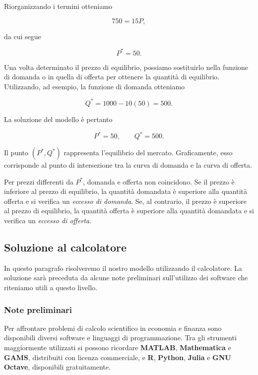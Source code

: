 Riorganizzando i termini otteniamo

\begin{equation*}
    750 = 15P,
\end{equation*}

da cui segue

\begin{equation*}
    P^* = 50.
\end{equation*}

Una volta determinato il prezzo di equilibrio, possiamo sostituirlo
nella funzione di domanda o in quella di offerta per ottenere la quantità di equilibrio. Utilizzando, ad esempio, la funzione di
domanda otteniamo

\begin{equation*}
    Q^* = 1000 - 10(50) = 500.
\end{equation*}

La soluzione del modello è pertanto

\begin{equation*}
    P^* = 50,
    \qquad
    Q^* = 500.
\end{equation*}

Il punto $(P^*,Q^*)$ rappresenta l'equilibrio del mercato.
Graficamente, esso corrisponde al punto di intersezione tra la curva
di domanda e la curva di offerta.

Per prezzi differenti da $P^*$, domanda e offerta non coincidono.
Se il prezzo è inferiore al prezzo di equilibrio, la quantità
domandata è superiore alla quantità offerta e si verifica un
\emph{eccesso di domanda}. Se, al contrario, il prezzo è superiore
al prezzo di equilibrio, la quantità offerta è superiore alla
quantità domandata e si verifica un \emph{eccesso di offerta}.

\subsection{Soluzione al calcolatore}

In questo paragrafo risolveremo il nostro modello utilizzando il calcolatore. La soluzione sarà preceduta da alcune note preliminari sull'utilizzo dei software che riteniamo utili a questo livello.

\subsubsection{Note preliminari}

Per affrontare problemi di calcolo scientifico in economia e finanza sono
disponibili diversi software e linguaggi di programmazione. Tra gli strumenti
maggiormente utilizzati si possono ricordare \textbf{MATLAB},
\textbf{Mathematica} e \textbf{GAMS}, distribuiti con licenza commerciale,
e \textbf{R}, \textbf{Python}, \textbf{Julia} e \textbf{GNU Octave},
disponibili gratuitamente. 

